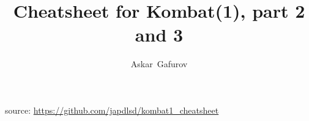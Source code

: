 \documentclass[10pt, twocolumn]{article}
\title{Cheatsheet for Kombat(1), part 2 and 3}
\author{Askar~Gafurov}
\begin{document}



\hrulefill

source: \url{https://github.com/japdlsd/kombat1_cheatsheet}
\end{document}
